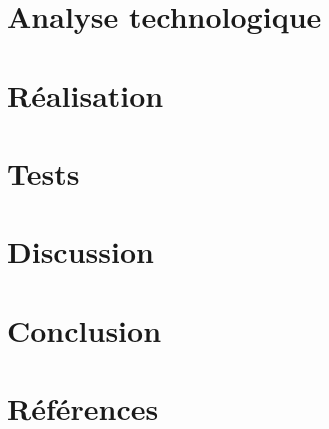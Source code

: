 \documentclass[a4paper, 12pt]{article}
\begin{document}
\section{Analyse technologique} %

\newpage

\section{Réalisation} %

\newpage

\section{Tests} %

\newpage

\section{Discussion} %

\newpage

\section{Conclusion} %

\newpage

\section{Références} %


\end{document}
